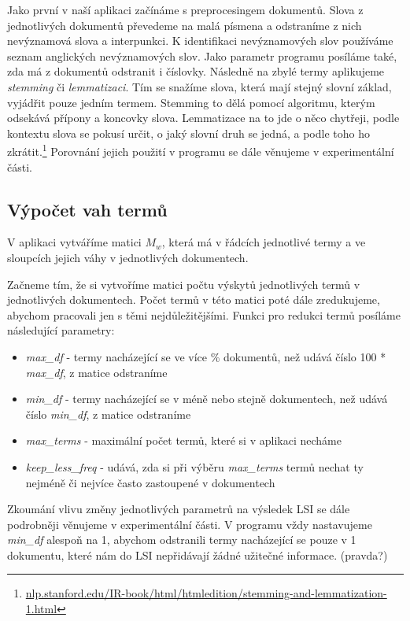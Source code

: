 \documentclass[11pt]{scrartcl} %
\begin{document}
Jako první v naší aplikaci začínáme s preprocesingem dokumentů. Slova z jednotlivých dokumentů převedeme na malá písmena a odstraníme z nich nevýznamová slova a interpunkci. K identifikaci nevýznamových slov používáme seznam anglických nevýznamových slov. Jako parametr programu posíláme také, zda má z dokumentů odstranit i číslovky. Následně na zbylé termy aplikujeme \emph{stemming} či \emph{lemmatizaci}. Tím se snažíme slova, která mají stejný slovní základ, vyjádřit pouze jedním termem. Stemming to dělá pomocí algoritmu, kterým odsekává přípony a koncovky slova. Lemmatizace na to jde o něco chytřeji, podle kontextu slova se pokusí určit, o jaký slovní druh se jedná, a podle toho ho zkrátit.\footnote{\url{nlp.stanford.edu/IR-book/html/htmledition/stemming-and-lemmatization-1.html}} Porovnání jejich použití v programu se dále věnujeme v experimentální části.

\subsection{Výpočet vah termů}
V aplikaci vytváříme matici $M_w$, která má v řádcích jednotlivé termy a ve sloupcích jejich váhy v jednotlivých dokumentech.

\bigskip 

Začneme tím, že si vytvoříme matici počtu výskytů jednotlivých termů v jednotlivých dokumentech. Počet termů v této matici poté dále zredukujeme, abychom pracovali jen s těmi nejdůležitějšími. Funkci pro redukci termů posíláme následující parametry:
\begin{itemize}
	\item \emph{max\_df} - termy nacházející se ve více \% dokumentů, než udává číslo 100 * \emph{max\_df}, z matice odstraníme
	\item \emph{min\_df} - termy nacházející se v méně nebo stejně dokumentech, než udává číslo \emph{min\_df}, z matice odstraníme
	\item \emph{max\_terms} - maximální počet termů, které si v aplikaci necháme
	\item \emph{keep\_less\_freq} - udává, zda si při výběru \emph{max\_terms} termů nechat ty nejméně či nejvíce často zastoupené v dokumentech  
\end{itemize}

\bigskip 

Zkoumání vlivu změny jednotlivých parametrů na výsledek LSI se dále podrobněji věnujeme v experimentální části. V programu vždy nastavujeme \emph{min\_df} alespoň na 1, abychom odstranili termy nacházející se pouze v 1 dokumentu, které nám do LSI nepřidávají žádné užitečné informace. (pravda?)
\end{document}
